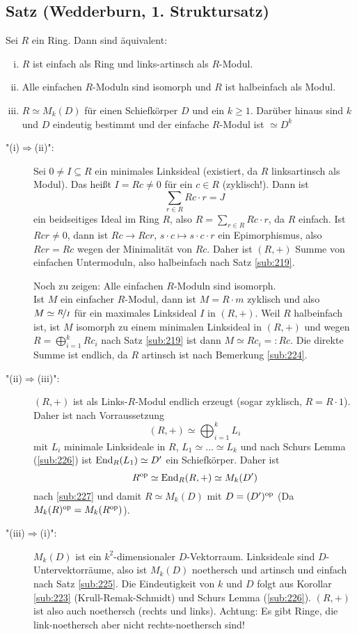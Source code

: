 \subsection{Satz (Wedderburn, 1. Struktursatz)} %
\label{sub:229}
Sei $R$ ein Ring. Dann sind äquivalent:
\begin{enumerate}[(i)]
	\item $R$ ist einfach als Ring und links-artinsch als $R$-Modul.
	\item Alle einfachen $R$-Moduln sind isomorph und $R$ ist halbeinfach als Modul. 
	\item $R \simeq M_k(D)$ für einen Schiefkörper $D$ und ein $k\ge 1$. 
	Darüber hinaus sind $k$ und $D$ eindeutig bestimmt und der einfache $R$-Modul ist  $\simeq D^k$
\end{enumerate}
\begin{description}
	\item["(i)$\Rightarrow $(ii)":] Sei $0  \not= I \subseteq R$ ein minimales Linksideal (existiert, da $R$ linksartinsch als Modul). Das heißt $I = R c \not= 0$ für ein
	$c \in R$ (zyklisch!). Dann ist 
	\[
		\sum_{r \in R} R c \cdot r = J
	\] 
	ein beidseitiges Ideal im Ring $R$, also $R= \sum_{r\in R} Rc\cdot r$, da $R$ einfach. Ist $Rc r \not= 0$, dann ist $R c \to R c r$, $s\cdot c\mapsto s \cdot c\cdot r$
	ein Epimorphismus, also $R c r = R c$ wegen der Minimalität von $R c$. Daher ist $(R,+)$ Summe von einfachen Untermoduln, also halbeinfach nach Satz \ref{sub:219}.
	
	Noch zu zeigen: Alle einfachen $R$-Moduln sind isomorph. \\
	Ist $M$ ein einfacher $R$-Modul, dann ist $M = R \cdot m$ zyklisch und also $M \simeq \nicefrac{R}{I}$ für ein maximales Linksideal $I$ in $(R,+)$. Weil $R$ halbeinfach
	ist, ist $M$ isomorph zu einem minimalen Linksideal in $(R,+)$ und wegen $R = \bigoplus_{i=1}^k R c_i$ nach Satz \ref{sub:219} ist dann $M \simeq R c_i =: Rc$. Die 
	direkte Summe ist endlich, da $R$ artinsch ist nach Bemerkung \ref{sub:224}.
	\item["(ii)$\Rightarrow $(iii)":]  $(R,+)$ ist als Links-$R$-Modul endlich erzeugt (sogar zyklisch, $R= R \cdot 1$). Daher ist nach Vorraussetzung 
	\[
		(R,+) \simeq \bigoplus_{i=1}^k L_i
	\]
	mit $L_i$ minimale Linksideale in $R$, $L_1 \simeq \ldots  \simeq L_k$ und nach Schurs Lemma (\ref{sub:226}) ist $\operatorname{End}_R(L_1) \simeq D'$ ein Schiefkörper. Daher ist
	\[
		R^{\mathrm{op}} \simeq \operatorname{End}_R(R,+) \simeq M_k(D')
	\]
	nach \ref{sub:227} und damit $R \simeq M_k(D)$ mit $D= (D')^{\mathrm{op}}$ (Da $M_k(R)^{\mathrm{op}} = M_k(R^{\mathrm{op}})$).
	\item["(iii)$\Rightarrow$(i)":] $M_k(D)$ ist ein $k^2$-dimensionaler $D$-Vektorraum. Linksideale sind $D$-Untervektorräume, also ist $M_k(D)$ noethersch und artinsch 
	und einfach nach Satz \ref{sub:225}. Die Eindeutigkeit von $k$ und $D$ folgt aus Korollar \ref{sub:223} (Krull-Remak-Schmidt) und Schurs Lemma (\ref{sub:226}). 
	\bewende
	$(R,+)$ ist also auch noethersch (rechts und links). Achtung: Es gibt Ringe, die link-noethersch aber nicht rechts-noethersch sind!
\end{description}

